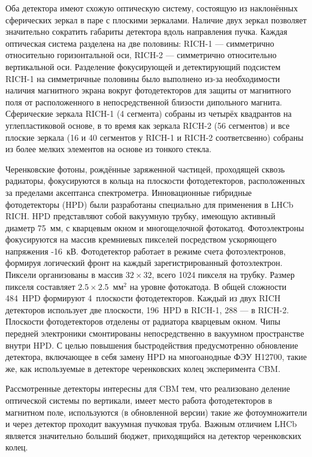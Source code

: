 Оба детектора имеют схожую оптическую систему, состоящую из наклонённых сферических зеркал в паре с плоскими зеркалами. Наличие двух зеркал позволяет значительно сократить габариты детектора вдоль направления пучка. Каждая оптическая система разделена на две половины: \mbox{RICH-1} --- симметрично относительно горизонтальной оси, \mbox{RICH-2} --- симметрично относительно вертикальной оси. Разделение фокусирующей и детектирующий подсистем \mbox{RICH-1} на симметричные половины было выполнено из-за необходимости наличия магнитного экрана вокруг фотодетекторов для защиты от магнитного поля от расположенного в непосредственной близости дипольного магнита. Сферические зеркала \mbox{RICH-1} (4 сегмента)
собраны из четырёх квадрантов на углепластиковой основе, в то время как зеркала \mbox{RICH-2} (56 сегментов) и все плоские зеркала (16 и 40 сегментов у \mbox{RICH-1} и \mbox{RICH-2} соответсвенно) собраны из более мелких элементов на основе из тонкого стекла.

Черенковские фотоны, рождённые заряженной частицей, проходящей сквозь радиаторы, фокусируются в кольца на плоскости фотодетекторов, расположенных за пределами аксептанса спектрометра. Инновационные гибридные фотодетекторы (HPD) были разработаны специально для применения в LHCb RICH. HPD представляют собой вакуумную трубку, имеющую активный диаметр 75~мм, с кварцевым окном и многощелочной фотокатод. Фотоэлектроны фокусируются на массив кремниевых пикселей посредством ускоряющего напряжения -16~кВ. Фотодетектор работает в режиме счета фотоэлектронов, формируя логический фронт на каждый зарегистрированный фотоэлектрон. Пиксели организованы в массив $32 \times 32$, всего 1024 пикселя на трубку. Размер пикселя составляет $2.5 \times 2.5$~мм$^{2}$ на уровне фотокатода. В общей сложности 484~HPD формируют 4~плоскости фотодетекторов. Каждый из двух RICH детекторов использует две плоскости, 196~HPD в \mbox{RICH-1}, 288 --- в \mbox{RICH-2}.
Плоскости фотодетекторов отделены от радиатора кварцевым окном. Чипы передней электроники смонтированы непосредственно в вакуумном пространстве внутри HPD. С целью повышения быстродействия предусмотренно обновление детектора, включающее в себя замену HPD на многоанодные ФЭУ H12700, такие же, как используемые в детекторе черенковских колец эксперимента CBM.

Рассмотренные детекторы интересны для CBM тем, что реализовано деление оптической системы по вертикали, имеет место работа фотодетекторов в магнитном поле, используются (в обновленной версии) такие же фотоумножители и через детектор проходит вакуумная пучковая труба.
Важным отличием LHCb является значительно больший бюджет, приходящийся на детектор черенковских колец.

